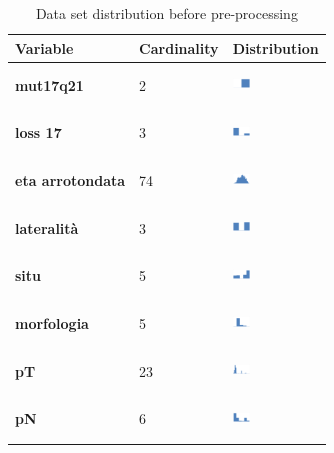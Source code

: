 \begin{table}[htbp]
\centering
\caption{Data set distribution before pre-processing}
\begin{tabularx}{0.7\textwidth}{lXX}
\toprule 
\textbf{Variable} & Cardinality & Distribution \\
\midrule 
\textbf{mut17q21} & 2 &  \includegraphics[width=0.2\textwidth, height=10mm]{methodology/images/mut17q21}\\
\textbf{loss 17} & 3 &  \includegraphics[width=0.2\textwidth, height=10mm]{methodology/images/loss_17}\\
\textbf{eta arrotondata} & 74 &  \includegraphics[width=0.2\textwidth, height=10mm]{methodology/images/eta_arrotondata}\\
\textbf{lateralit\`a} & 3 & \includegraphics[width=0.2\textwidth, height=10mm]{methodology/images/lateralita} \\
\textbf{situ} & 5 & \includegraphics[width=0.2\textwidth, height=10mm]{methodology/images/situ} \\
\textbf{morfologia} & 5 & \includegraphics[width=0.2\textwidth, height=10mm]{methodology/images/morfologia} \\
\textbf{pT} & 23 & \includegraphics[width=0.2\textwidth, height=10mm]{methodology/images/pt} \\
\textbf{pN} & 6 & \includegraphics[width=0.2\textwidth, height=10mm]{methodology/images/pn} \\

\end{tabularx}
\end{table}

